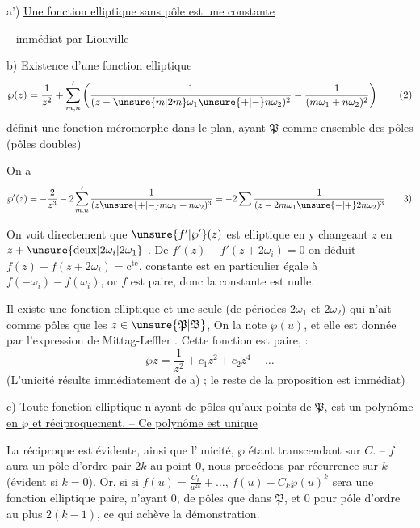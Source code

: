 a')  \uline{Une fonction elliptique sans pôle est une constante}

-- \uline{immédiat par} Liouville


b) Existence d'une fonction elliptique 
\[
\wp(z)=\frac{1}{z^2}+\sum_{m,n}'\left(\frac{1}{(z-\unsure{m|2m}\omega_1\unsure{+|-}n\omega_2)^2}-\frac{1}{(m\omega_1+n\omega_2)^2}\right)\tag*{(2)}
\]
définit une fonction méromorphe dans  le plan, ayant  $\mathfrak P$ comme ensemble des pôles (pôles doubles)

On a
\[
\wp'(z)=-\frac{2}{z^3}-2\sum_{m,n}'\frac{1}{(z\unsure{+|-}m\omega_1+n\omega_2)^3}
=-2\sum\frac{1}{(z-2m\omega_1\unsure{-|+}2n\omega_2)^3}\tag*{3)}
\]

On voit directement que $\unsure{f'|\wp'}(z)$ est elliptique en y changeant $z$ en $z+\unsure{\text{deux}|2\omega_i|2\omega_1}$ . De $f'(z)-f'(z+2\omega_i)=0$ on déduit $f(z)-f(z+2\omega_i)=\mathrm{c}^{\mathrm{te}}$,  constante est en particulier égale à $f(-\omega_i)-f(\omega_i)$, or $f$ est paire, donc la constante est nulle. 

Il existe une fonction elliptique et une seule (de périodes $2\omega_1$ et $2\omega_2$) qui n'ait comme pôles que les $z\in\unsure{\mathfrak P|\mathfrak B}$,   On la note $\wp(u)$, et elle est donnée par l'expression de Mittag-Leffler . Cette fonction est paire,  :
\[
\wp z=\frac1{z^2}+c_1z^2+c_2z^4+\ldots
\]
(L'unicité résulte immédiatement de a) ; le reste de la proposition est immédiat)

c) \uline{Toute fonction elliptique   n'ayant de pôles qu'aux points de $\mathfrak P$, est un polynôme en $\wp$ \deleted{\unsure{,}} et réciproquement. -- Ce polynôme est unique}

La réciproque est évidente, ainsi que l'unicité, $\wp$ étant transcendant sur $C$. -- $f$ aura un pôle d'ordre pair $2k$ au point $0$, nous procédons par récurrence sur $k$ (évident si $k=0$). Or, si  si $f(u)=\frac{C_k}{u^{2k}}+\ldots$, $f(u)-C_k\wp(u)^k$ sera  une fonction elliptique paire, n'ayant  $0$, de pôles que dans $\mathfrak P$, et $0$ pour pôle d'ordre au plus $2(k-1)$, ce qui achève la démonstration.

